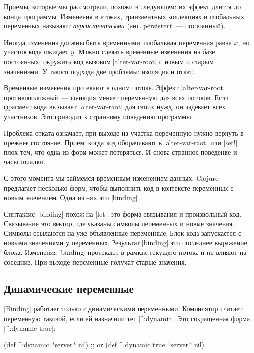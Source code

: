 Приемы, которые мы рассмотрели, похожи в следующем: их эффект длится до конца
программы. Изменения в атомах, транзиентных коллекциях и глобальных переменных
называют \emph{персистентными} (анг. persistent~--- постоянный).

Иногда изменения должны быть временными: глобальная переменная равна $x$, но
участок кода ожидает $y$. Можно сделать временные изменения на базе постоянных:
окружить код вызовом \spverb|alter-var-root| с новым и старым значениями. У
такого подхода две проблемы: изоляция и откат.

Временные изменения протекают в одном потоке. Эффект \spverb|alter-var-root|
противоположный~--- функция меняет переменную для всех потоков. Если фрагмент
кода вызывает \spverb|alter-var-root| для своих нужд, он задевает всех
участников. Это приводит к странному поведению программы.

Проблема отката означает, при выходе из участка переменную нужно вернуть в
прежнее состояние. Прием, когда код оборачивают в \spverb|alter-var-root| или
\spverb|set!| плох тем, что одна из форм может потеряться. И снова странное
поведение и часы отладки.

С этого момента мы займемся временным изменением данных. Clojure предлагает
несколько форм, чтобы выполнить код в контексте переменных с новым
значением. Одна из них это \spverb|binding| .

Синтаксис \spverb|binding| похож на \spverb|let|: это форма связывания и
произвольный код. Связывание это вектор, где указаны символы переменных и новые
значения. Символы ссылаются на уже объявленные переменные. Блок кода запускается
с новыми значениями у переменных. Результат \spverb|binding| это последнее
выражение блока. Изменения \spverb|binding| протекают в рамках текущего потока и
не влияют на соседние. При выходе переменные получат старые значения.

\subsection{Динамические переменные}

\label{dynamic-vars}

\spverb|Binding| работает только с динамическими переменными. Компилятор считает
переменную таковой, если ей назначили тег \spverb|^:dynamic|. Это сокращенная
форма \spverb|^{:dynamic true}|:

\begin{english}
  \begin{clojure}
(def ^:dynamic *server* nil)
;; or
(def ^{:dynamic true} *server* nil)
  \end{clojure}
\end{english}

